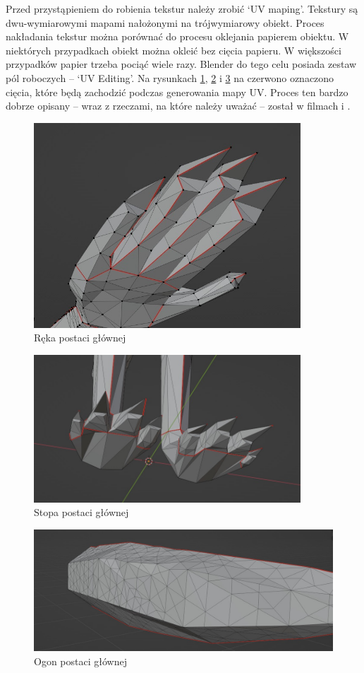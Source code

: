 \documentclass[12pt,twoside]{article}
\begin{document}
Przed przystąpieniem do robienia tekstur należy zrobić `UV maping'. Tekstury są
dwu-wymiarowymi mapami nałożonymi na trójwymiarowy obiekt. Proces nakładania
tekstur można porównać do procesu oklejania papierem obiektu. W niektórych
przypadkach obiekt można okleić bez cięcia papieru. W większości przypadków
papier trzeba pociąć wiele razy.  Blender do tego celu posiada zestaw pól roboczych
– `UV Editing'. Na rysunkach \ref{MC:Hand}, \ref{MC:Foot} i \ref{MC:Tail} na czerwono oznaczono
cięcia, które będą zachodzić podczas generowania mapy UV. Proces ten bardzo
dobrze opisany -- wraz z rzeczami, na które należy uważać -- został w filmach
\cite{blender_UV_editing_advanced} i \cite{blender_UV_editing_simple}.

\begin{figure}[!h]
    \centering
	\includegraphics[width=10cm]{RealizacjaProjektu/MC/Model_hand.jpg}
	\caption{Ręka postaci głównej}
    \label{MC:Hand}
\end{figure}
\begin{figure}[!ht]
    \centering
	\includegraphics[width=10cm]{RealizacjaProjektu/MC/Model_feet.jpg}
	\caption{Stopa postaci głównej}
    \label{MC:Foot}
\end{figure}
\begin{figure}[!ht]
    \centering
	\includegraphics[width=12cm]{RealizacjaProjektu/MC/model_tail.jpg}
	\caption{Ogon postaci głównej}
    \label{MC:Tail}
\end{figure}
\end{document}
